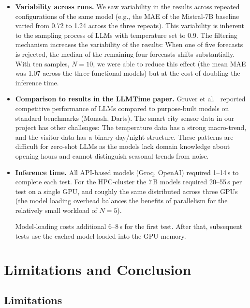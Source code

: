 \documentclass[11pt,a4paper]{article}
\begin{document}
\begin{itemize}[leftmargin=*]
\item \textbf{Variability across runs.}
We saw variability in the results across repeated configurations of the same model (e.g., the MAE of the Mistral-7B baseline varied from 0.72 to 1.24 across the three repeats).
This variability is inherent to the sampling process of LLMs with temperature set to 0.9.
The filtering mechanism increases the variability of the results: When one of five forecasts is rejected, the median of the remaining four forecasts shifts substantially.
With ten samples, $N = 10$, we were able to reduce this effect (the mean MAE was 1.07 across the three functional models) but at the cost of doubling the inference time.

\item \textbf{Comparison to results in the LLMTime paper.}
Gruver et al.~\cite{gruver2023llmtime} reported competitive performance of LLMs compared to purpose-built models on standard benchmarks (Monash, Darts).
The smart city sensor data in our project has other challenges: The temperature data has a strong macro-trend, and the visitor data has a binary day/night structure.
These patterns are difficult for zero-shot LLMs as the models lack domain knowledge about opening hours and cannot distinguish seasonal trends from noise.

\item \textbf{Inference time.}
All API-based models (Groq, OpenAI) required 1--14\,s to complete each test.
For the HPC-cluster the 7\,B models required 20--55\,s per test on a single GPU, and roughly the same distributed across three GPUs (the model loading overhead balances the benefits of parallelism for the relatively small workload of $N = 5$).

Model-loading costs additional 6--8\,s for the first test. After that, subsequent tests use the cached model loaded into the GPU memory.
\end{itemize}


\section{Limitations and Conclusion}
\label{sec:limitations}

\subsection{Limitations}
\end{document}
